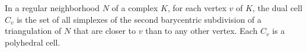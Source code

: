 In a regular neighborhood $N$ of a complex $K$, for each vertex $v$ of $K$, the dual cell $C_v$ is the set of all simplexes of the second barycentric subdivision of a triangulation of $N$ that are closer to $v$ than to any other vertex. Each $C_v$ is a polyhedral cell.
